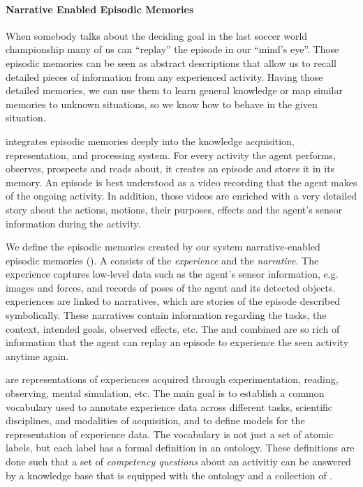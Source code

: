 \paragraph{Narrative Enabled Episodic Memories}
When somebody talks about the deciding goal in the last soccer world championship many of us can ``replay'' the episode in our ``mind's eye''.
Those episodic memories can be seen as abstract descriptions that allow us to recall detailed pieces of information from any experienced activity.
Having those detailed memories, we can use them to learn general knowledge or map similar memories to unknown situations, so we know how to behave in the given situation.

\ease integrates episodic memories deeply into the knowledge acquisition, representation, and processing system. 
For every activity the agent performs, observes, prospects and reads about, it creates an episode and stores it in its memory.
An episode is best understood as a video recording that the agent makes of the ongoing activity.
In addition, those videos are enriched with a very detailed story about the actions, motions, their purposes, effects and the agent's sensor information during the activity.

We define the episodic memories created by our system narrative-enabled episodic memories (\neems).
A \neem consists of the \emph{\neem experience} and the \emph{\neem narrative}.
The \neem experience captures low-level data such as the agent's sensor information, e.g. images and forces, and records of poses of the agent and its detected objects.
\neem experiences are linked to \neem narratives, which are stories of the episode described symbolically.
These narratives contain information regarding the tasks, the context, intended goals, observed effects, etc.
The \neemexp and \neemnar combined are so rich of information that the agent can replay an episode to experience the seen activity anytime again.

\neems are representations of experiences acquired through experimentation, reading, observing, mental simulation, etc.
The main goal is to establish a common vocabulary used to annotate experience data across different tasks, scientific disciplines, and modalities of acquisition, and to define models for the representation of experience data.
The vocabulary is not just a set of atomic labels, but each label has a formal definition in an ontology.
These definitions are done such that a set of \emph{competency questions} about an activitiy can be answered by a knowledge base that is equipped with the ontology and a collection of \neems.

